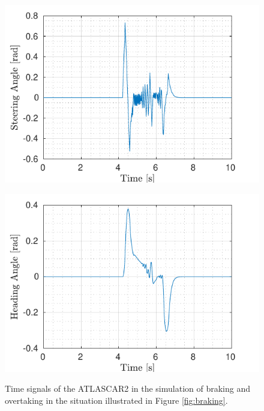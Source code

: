 \begin{figure}[!t]
\begin{minipage}[t]{0.5\textwidth}
		\includegraphics[width=\textwidth]{./figure/three_obstacles_no_overtaking/SteeringAngleVsTime.pdf}
		\subcaption{}\label{fig:delta_braking}
	\end{minipage}
	\begin{minipage}[t]{0.5\textwidth}
		\includegraphics[width=\textwidth]{./figure/three_obstacles_no_overtaking/HeadingAngleVsTime.pdf}
		\subcaption{}\label{fig:theta_braking}
	\end{minipage}
	\caption{Time signals of the ATLASCAR2 in the simulation of braking and overtaking in the situation illustrated in Figure \ref{fig:braking}.}
	\label{fig:components}
\end{figure}
